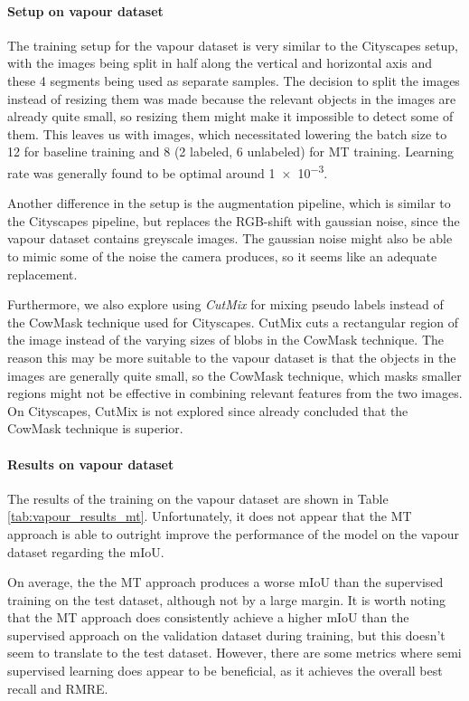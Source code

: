 \paragraph{Setup on vapour dataset}
The training setup for the vapour dataset is very similar to the Cityscapes setup, with the images being split in half along the vertical and horizontal axis and these 4 segments being used as separate samples. The decision to split the images instead of resizing them was made because the relevant objects in the images are already quite small, so resizing them might make it impossible to detect some of them. This leaves us with  images, which necessitated lowering the batch size to 12 for baseline training and 8 (2 labeled, 6 unlabeled) for MT training.
Learning rate was generally found to be optimal around \num{1e-3}.

Another difference in the setup is the augmentation pipeline, which is similar to the Cityscapes pipeline, but replaces the RGB-shift with gaussian noise, since the vapour dataset contains greyscale images. The gaussian noise might also be able to mimic some of the noise the camera produces, so it seems like an adequate replacement.

Furthermore, we also explore using \emph{CutMix}\cite{yunCutMixRegularizationStrategy2019} for mixing pseudo labels instead of the CowMask technique used for Cityscapes. 
CutMix cuts a rectangular region of the image instead of the varying sizes of blobs in the CowMask technique.
The reason this may be more suitable to the vapour dataset is that the objects in the images are generally quite small, so the CowMask technique, which masks smaller regions might not be effective in combining relevant features from the two images. On Cityscapes, CutMix is not explored since \cite{schererPseudoLabelNoiseSuppression2022} already concluded that the CowMask technique is superior.

\paragraph{Results on vapour dataset}

The results of the training on the vapour dataset are shown in Table \ref{tab:vapour_results_mt}. 
Unfortunately, it does not appear that the MT approach is able to outright improve the performance of the model on the vapour dataset regarding the mIoU.

On average, the the MT approach produces a worse mIoU than the supervised training on the test dataset, although not by a large margin. 
It is worth noting that the MT approach does consistently achieve a higher mIoU than the supervised approach on the validation dataset during training, but this doesn't seem to translate to the test dataset.
However, there are some metrics where semi supervised learning does appear to be beneficial, as it achieves the overall best recall and RMRE. 

